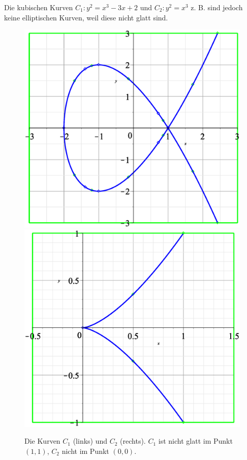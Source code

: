 	Die kubischen Kurven $C_1\colon y^2 = x^3 - 3x +2$ und $C_2\colon y^2 = x^3$ z. B. sind jedoch keine elliptischen Kurven, weil diese nicht glatt sind.

\begin{figure}[h]
	\centering
	\includegraphics[scale=.3]{img/curve_0_3.eps} \hspace{2cm}
	\includegraphics[scale=.3]{img/curve_0_4.eps}
	\caption{Die Kurven $C_1$ (links) und $C_2$ (rechts). $C_1$ ist nicht glatt im Punkt $(1,1)$, $C_2$ nicht im Punkt $(0,0)$.}
	\label{fig:bsp}
\end{figure}

